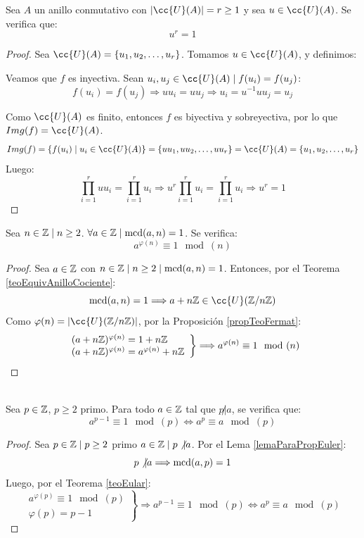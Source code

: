 \begin{prop}
    \label{propTeoFermat}
    Sea $A$ un anillo conmutativo con $|\cc{U}(A)|=r \geq 1$ y sea $u \in \cc{U}(A)$. Se verifica que:
    $$u^r = 1$$
\begin{proof}
    Sea $\cc{U}(A) = \{u_1, u_2, \ldots, u_r\}$. Tomamos $u \in \cc{U}(A)$, y definimos:
    
    Veamos que $f$ es inyectiva. Sean $u_i, u_j \in \cc{U}(A) \mid f(u_i)=f(u_j)$:
    $$f(u_i)=f(u_j) \Longrightarrow uu_i = uu_j \Longrightarrow u_i = u^{-1}uu_j = u_j$$

    Como $\cc{U}(A)$ es finito, entonces $f$ es biyectiva y sobreyectiva, por lo que $Img(f)=\cc{U}(A)$.
    $$Img(f) = \{f(u_i) \mid u_i \in \cc{U}(A)\} = \{uu_1, uu_2, \ldots, uu_r\} = \cc{U}(A) = \{u_1, u_2, \ldots, u_r\}$$
    Luego:
    $$\prod_{i=1}^r uu_i = \prod_{i=1}^r u_i \Longrightarrow u^r\prod_{i=1}^r u_i = \prod_{i=1}^r u_i \Longrightarrow u^r = 1$$
\end{proof}
\end{prop}


\begin{teo}[de Euler]
    \label{teoEular}
    Sea $n \in \mathbb Z \mid n\geq 2$. $\forall a \in \mathbb Z \mid \operatorname{mcd}(a,n)=1$. Se verifica:
    $$a^{\varphi(n)}\equiv 1\mod(n)$$
\begin{proof} 
    Sea $a \in \mathbb Z$ con $n \in \mathbb Z \mid n\geq 2 \mid \operatorname{mcd}(a,n)=1$. Entonces, por el Teorema \ref{teoEquivAnilloCociente}:
    $$\mcd(a,n)=1 \Longrightarrow a+n\Z \in \cc{U}(\Z/n\Z)$$
    Como $\varphi(n) = |\cc{U}(\Z/n\Z)|$, por la Proposición \ref{propTeoFermat}:
    $$\left. \begin{array}{l}
            (a+n\mathbb Z)^{\varphi(n)}=1+n\mathbb Z \\
            (a+n\mathbb Z)^{\varphi(n)}=a^{\varphi(n)}+n\mathbb Z
        \end{array} \right\} \Longrightarrow a^{\varphi(n)}\equiv 1\mod(n)$$
\end{proof}
\end{teo}

\begin{teo}
    \ \\
    \label{teoFermat}
    Sea $p \in \mathbb Z$, $p\geq 2$ primo. Para todo $a \in \mathbb Z$ tal que $p\not|a$, se verifica que:
    $$a^{p-1}\equiv 1\mod(p) \Longleftrightarrow a^p\equiv a\mod(p)$$
\begin{proof}
    Sea $p \in \mathbb Z \mid p\geq 2$ primo $a \in \mathbb Z \mid p\not| a$. Por el Lema \ref{lemaParaPropEuler}:
    $$p\not|a \Longrightarrow \operatorname{mcd}(a,p)=1$$
    Luego, por el Teorema \ref{teoEular}:
    $$\left. \begin{array}{l}
            a^{\varphi(p)}\equiv 1\mod(p) \\
            \varphi(p) = p-1
        \end{array} \right\} \Longrightarrow a^{p-1} \equiv 1\mod(p) \Longleftrightarrow a^p \equiv a\mod(p)$$
\end{proof}
\end{teo}

